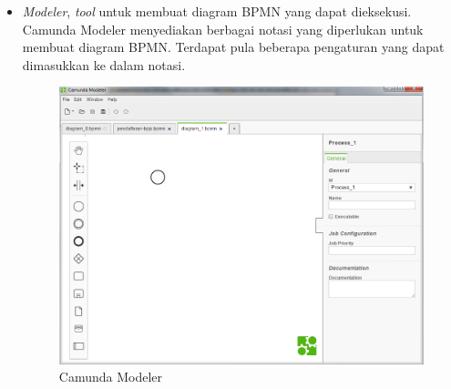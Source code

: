 \begin{itemize}
	\item \textit{Modeler}, \textit{tool} untuk membuat diagram BPMN yang dapat dieksekusi. Camunda Modeler menyediakan berbagai notasi yang diperlukan untuk membuat diagram BPMN. Terdapat pula beberapa pengaturan yang dapat dimasukkan ke dalam notasi.
		\begin{figure}[H]
			\centering
			\includegraphics[scale=0.4]{Gambar/Bab-2/bpms/camundaModeler}
			\caption{Camunda Modeler} 
			\label{fig:camundamodeler}
		\end{figure}
	

\end{itemize}
